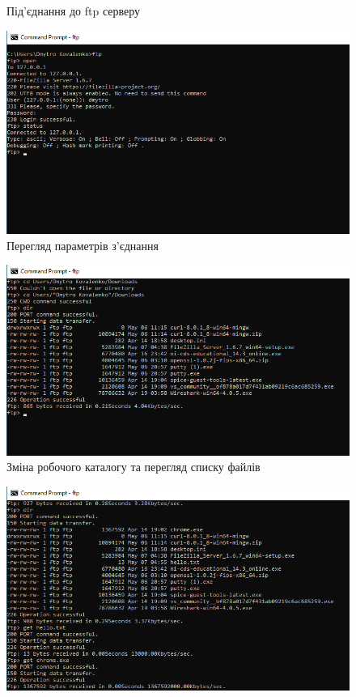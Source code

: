 \documentclass{article}
\begin{document}
\begin{normalsize}
\begin{figure}[H]
	\caption{Під'єднання до ftp серверу}
\end{figure}
\begin{figure}[H]
	\centering
	\includegraphics[width=\textwidth]{4}
	\caption{Перегляд параметрів з'єднання}
\end{figure}
\begin{figure}[H]
	\centering
	\includegraphics[width=\textwidth]{5}
	\caption{Зміна робочого каталогу та перегляд списку файлів}
\end{figure}
\begin{figure}[H]
	\centering
	\includegraphics[width=\textwidth]{6}

\end{figure}
\end{normalsize}
\end{document}
